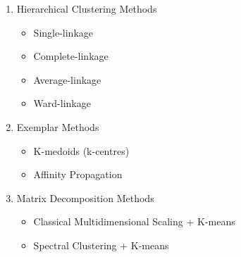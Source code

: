 \documentclass[10pt]{article}
\begin{document}
\begin{enumerate}
	\item Hierarchical Clustering Methods
	\begin{itemize}
		\item Single-linkage
		\item Complete-linkage
		\item Average-linkage
		\item Ward-linkage
	\end{itemize}
	\item Exemplar Methods
	\begin{itemize}
		\item K-medoids (k-centres)
		\item Affinity Propagation
	\end{itemize}
	\item Matrix Decomposition Methods
	\begin{itemize}
		\item Classical Multidimensional Scaling + K-means
		\item Spectral Clustering + K-means
	\end{itemize}
\end{enumerate}

\end{document}

